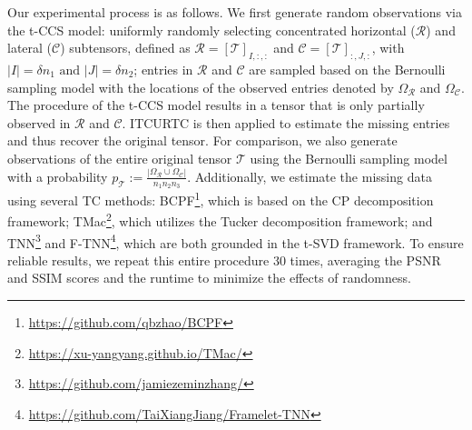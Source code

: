 \documentclass[twoside,12pt]{article}
\begin{document}
Our experimental process is as follows. We first generate random observations via the t-CCS model: uniformly randomly selecting concentrated horizontal (\(\mathcal{R}\)) and lateral (\(\mathcal{C}\)) subtensors, defined as \(\mathcal{R} = [\mathcal{T}]_{I,:,:}\) and \(\mathcal{C} = [\mathcal{T}]_{:,J,:}\), with  \( |I|=\delta n_{1} \text{ and }|J|=\delta n_2\); entries in \(\mathcal{R}\) and \(\mathcal{C}\) are sampled based on the Bernoulli sampling model with the locations of the  observed entries denoted by \( \Omega_{\mathcal{R}} \) and \( \Omega_{\mathcal{C}} \). The procedure of the t-CCS model results in a tensor that is only partially observed in  \(\mathcal{R}\) and \(\mathcal{C}\). ITCURTC is then applied to estimate the missing entries and thus  recover the original tensor. For comparison, we also generate observations of the entire original tensor \( \mathcal{T} \) using the Bernoulli sampling model  with a   probability  \( p_{\mathcal{T}} := \frac{|\Omega_{\mathcal{R}}\cup \Omega_{\mathcal{C}}|}{n_{1}n_{2}n_{3}} \).  Additionally, we estimate the missing data using several TC methods:  BCPF\footnote{\url{https://github.com/qbzhao/BCPF}}, which is based on the CP decomposition framework; TMac\footnote{\url{https://xu-yangyang.github.io/TMac/}}, which utilizes the Tucker decomposition framework; and TNN\footnote{\url{https://github.com/jamiezeminzhang/}} and F-TNN\footnote{\url{https://github.com/TaiXiangJiang/Framelet-TNN}}, which are both grounded in the t-SVD framework.  To ensure reliable results, we repeat this entire procedure 30 times, averaging the PSNR and SSIM scores and the runtime to minimize the effects of randomness. 
\end{document}
